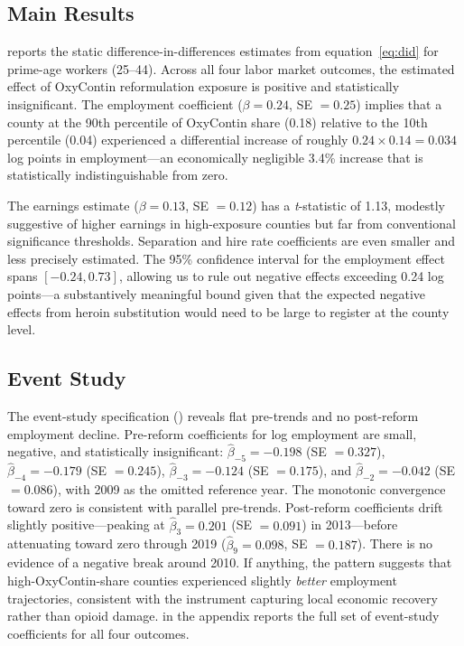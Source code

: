 \documentclass[12pt]{article}
\begin{document}
\subsection{Main Results}

 reports the static difference-in-differences estimates from equation~\eqref{eq:did} for prime-age workers (25--44). Across all four labor market outcomes, the estimated effect of OxyContin reformulation exposure is positive and statistically insignificant. The employment coefficient ($\beta = 0.24$, SE $= 0.25$) implies that a county at the 90th percentile of OxyContin share (0.18) relative to the 10th percentile (0.04) experienced a differential increase of roughly $0.24 \times 0.14 = 0.034$ log points in employment---an economically negligible 3.4\% increase that is statistically indistinguishable from zero.

The earnings estimate ($\beta = 0.13$, SE $= 0.12$) has a \textit{t}-statistic of 1.13, modestly suggestive of higher earnings in high-exposure counties but far from conventional significance thresholds. Separation and hire rate coefficients are even smaller and less precisely estimated. The 95\% confidence interval for the employment effect spans $[-0.24, 0.73]$, allowing us to rule out negative effects exceeding 0.24 log points---a substantively meaningful bound given that the expected negative effects from heroin substitution would need to be large to register at the county level.



\subsection{Event Study}

The event-study specification () reveals flat pre-trends and no post-reform employment decline. Pre-reform coefficients for log employment are small, negative, and statistically insignificant: $\hat{\beta}_{-5} = -0.198$ (SE $= 0.327$), $\hat{\beta}_{-4} = -0.179$ (SE $= 0.245$), $\hat{\beta}_{-3} = -0.124$ (SE $= 0.175$), and $\hat{\beta}_{-2} = -0.042$ (SE $= 0.086$), with 2009 as the omitted reference year. The monotonic convergence toward zero is consistent with parallel pre-trends. Post-reform coefficients drift slightly positive---peaking at $\hat{\beta}_{3} = 0.201$ (SE $= 0.091$) in 2013---before attenuating toward zero through 2019 ($\hat{\beta}_{9} = 0.098$, SE $= 0.187$). There is no evidence of a negative break around 2010. If anything, the pattern suggests that high-OxyContin-share counties experienced slightly \textit{better} employment trajectories, consistent with the instrument capturing local economic recovery rather than opioid damage.  in the appendix reports the full set of event-study coefficients for all four outcomes.
\end{document}
